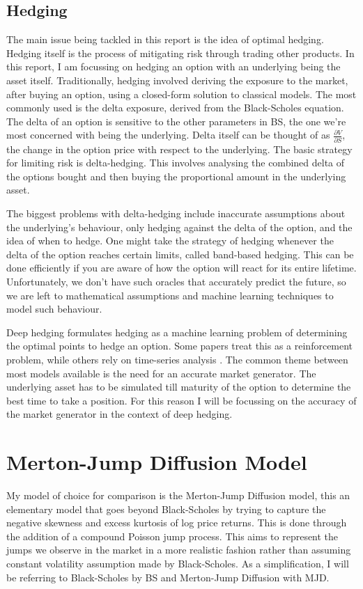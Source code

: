 \documentclass[12pt]{article}
\newcommand{\newp}
    {
    \vskip 0.5cm 
  }
\numberwithin{equation}{section}
\begin{document}
\subsection{Hedging}
The main issue being tackled in this report is the idea of optimal hedging. 
Hedging itself is the process of mitigating risk through trading other products. 
In this report, I am focussing on hedging an option with an underlying being the 
asset itself. Traditionally, hedging involved deriving the exposure to the market, 
after buying an option, using a closed-form solution to classical models. The most 
commonly used is the delta exposure, derived from the Black-Scholes equation. 
The delta of an option is sensitive to the other parameters in BS, the one we're 
most concerned with being the underlying. Delta itself can be thought of as 
$\frac{\partial V}{\partial S}$, the change in the option price with respect to 
the underlying. 
The basic strategy for limiting risk is delta-hedging. This involves analysing 
the combined delta of the options bought and then buying the proportional amount 
in the underlying asset. 
\newp 
The biggest problems with delta-hedging include inaccurate assumptions about the 
underlying's behaviour, only hedging against the delta of the option, and the idea 
of when to hedge. One might take the strategy of hedging whenever the delta of 
the option reaches certain limits, called band-based hedging. This can be done 
efficiently if you are aware of how the option will react for its entire lifetime. 
Unfortunately, we don't have such oracles that accurately predict the future, so 
we are left to mathematical assumptions and machine learning techniques to 
model such behaviour. 
\newp 
Deep hedging formulates hedging as a machine learning problem of determining the 
optimal points to hedge an option. Some papers treat this as a reinforcement 
problem, while others rely on time-series analysis \autocite{buehler_deep_2022}. 
The common theme between 
most models available is the need for an accurate market generator. The underlying 
asset has to be simulated till maturity of the option to determine the best time 
to take a position. For this reason I will be focussing on the accuracy of the 
market generator in the context of deep hedging. 
\clearpage

\section{Merton-Jump Diffusion Model}
My model of choice for comparison is the Merton-Jump Diffusion model, this an 
elementary model that goes beyond Black-Scholes by trying to capture the negative
skewness and excess kurtosis of log price returns. This is done through the 
addition of a compound Poisson jump process. This aims to represent the jumps 
we observe in the market in a more realistic fashion rather than assuming constant 
volatility assumption made by Black-Scholes. As a simplification, I will be referring 
to Black-Scholes by BS and Merton-Jump Diffusion with MJD.
\end{document}
